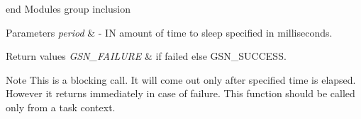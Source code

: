 end Modules group inclusion


\begin{DoxyParams}{Parameters}
{\em period} & -\/ IN amount of time to sleep specified in milliseconds. \\
\hline
\end{DoxyParams}

\begin{DoxyRetVals}{Return values}
{\em GSN\_\-FAILURE} & if failed else GSN\_\-SUCCESS. \\
\hline
\end{DoxyRetVals}
\begin{DoxyNote}{Note}
This is a blocking call. It will come out only after specified time is elapsed. However it returns immediately in case of failure. This function should be called only from a task context. 
\end{DoxyNote}
